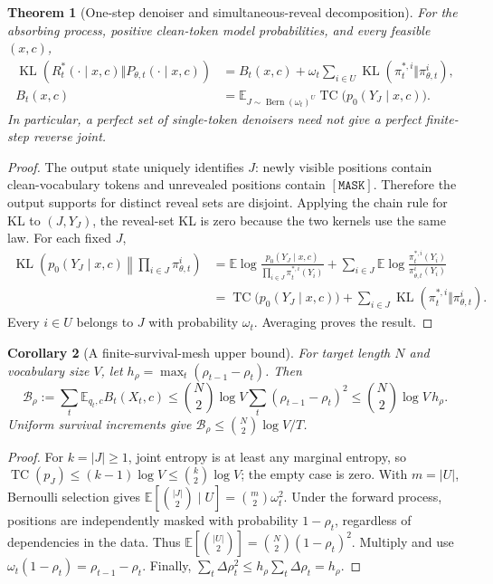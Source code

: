 \documentclass{article}
\newtheorem{theorem}{Theorem}[section]
\newtheorem{corollary}[theorem]{Corollary}
\theoremstyle{remark}\newtheorem{remark}[theorem]{Remark}
\newcommand{\E}{\mathbb E}
\newcommand{\KL}{\operatorname{KL}}
\newcommand{\mask}{\mathtt{[MASK]}}
\begin{document}
\begin{theorem}[One-step denoiser and simultaneous-reveal decomposition]
\label{thm:revealdecomposition}
For the absorbing process, positive clean-token model probabilities, and every feasible $(x,c)$,
\begin{align}
 \KL(R_t^*(\cdot\mid x,c)\Vert P_{\theta,t}(\cdot\mid x,c))
 &=B_t(x,c)
 +\omega_t\sum_{i\in U}\KL(\pi_t^{*,i}\Vert\pi_{\theta,t}^i),\\
 B_t(x,c)&=\E_{J\sim\operatorname{Bern}(\omega_t)^U}
 \operatorname{TC}\bigl(p_0(Y_J\mid x,c)\bigr).
 \label{eq:revealKL}
\end{align}
In particular, a perfect set of single-token denoisers need not give a perfect finite-step reverse joint.
\end{theorem}
\begin{proof}
The output state uniquely identifies $J$: newly visible positions contain clean-vocabulary tokens and unrevealed positions contain $\mask$. Therefore the output supports for distinct reveal sets are disjoint. Applying the chain rule for KL to $(J,Y_J)$, the reveal-set KL is zero because the two kernels use the same law. For each fixed $J$,
\begin{align*}
 \KL\left(p_0(Y_J\mid x,c)\middle\Vert\prod_{i\in J}\pi_{\theta,t}^i\right)
 &=\E\log\frac{p_0(Y_J\mid x,c)}{\prod_{i\in J}\pi_t^{*,i}(Y_i)}
 +\sum_{i\in J}\E\log\frac{\pi_t^{*,i}(Y_i)}{\pi_{\theta,t}^i(Y_i)}\\
 &=\operatorname{TC}\bigl(p_0(Y_J\mid x,c)\bigr)
 +\sum_{i\in J}\KL(\pi_t^{*,i}\Vert\pi_{\theta,t}^i).
\end{align*}
Every $i\in U$ belongs to $J$ with probability $\omega_t$. Averaging proves the result.
\end{proof}

\begin{corollary}[A finite-survival-mesh upper bound]
\label{cor:mesh}
For target length $N$ and vocabulary size $V$, let
$h_\rho=\max_t(\rho_{t-1}-\rho_t)$. Then
\begin{equation}
 \mathcal B_\rho:=\sum_t\E_{q_t,c}B_t(X_t,c)
 \le \binom{N}{2}\log V\sum_t(\rho_{t-1}-\rho_t)^2
 \le \binom{N}{2}\log V\,h_\rho.
 \label{eq:meshbound}
\end{equation}
Uniform survival increments give $\mathcal B_\rho\le \binom{N}{2}\log V/T$.
\end{corollary}
\begin{proof}
For $k=|J|\ge1$, joint entropy is at least any marginal entropy, so
$\operatorname{TC}(p_J)\le(k-1)\log V\le \binom{k}{2}\log V$; the empty case is zero. With $m=|U|$, Bernoulli selection gives
$\E[\binom{|J|}{2}\mid U]=\binom{m}{2}\omega_t^2$.
Under the forward process, positions are independently masked with probability $1-\rho_t$, regardless of dependencies in the data. Thus
$\E[\binom{|U|}{2}]=\binom{N}{2}(1-\rho_t)^2$.
Multiply and use $\omega_t(1-\rho_t)=\rho_{t-1}-\rho_t$. Finally,
$\sum_t\Delta\rho_t^2\le h_\rho\sum_t\Delta\rho_t=h_\rho$.
\end{proof}
\end{document}
